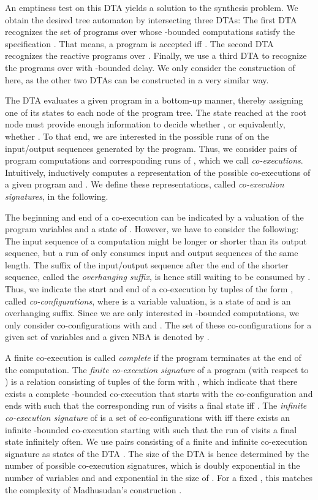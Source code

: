 \documentclass[submission,copyright,creativecommons]{eptcs}
\newcommand{\ignore}[1]{}
\begin{document}
An emptiness test on this DTA yields a solution to the synthesis problem.
We obtain the desired tree automaton by intersecting three DTAs:
The first DTA  recognizes
the set of programs over  whose -bounded computations satisfy the
specification . That means, a program  is accepted iff
.
The second DTA  recognizes the reactive
programs over .
Finally, we use a third DTA  to recognize the programs
over  with -bounded delay.
We only consider the construction of  here,
as the other two DTAs can be constructed in a very similar way.

The DTA  evaluates a given program  in a
bottom-up manner, thereby assigning one of its states to each node of the
program tree.
The state reached at the root node must provide
enough information to decide whether ,
or equivalently, whether
.
To that end, we are interested in the possible runs of 
on the input/output sequences generated by the program.
Thus, we consider pairs of program computations and corresponding runs of
, which we call \emph{co-executions}.
Intuitively,  inductively computes a
representation of the possible co-executions of a given program and
.
We define these representations, called \emph{co-execution signatures},
in the following.

The beginning and end of a co-execution can be indicated by
a valuation of the program variables and a state of .
However, we have to consider the following:
The input sequence of a computation might be longer or shorter than
its output sequence, but a run of  only consumes input and
output sequences of the same length.
The suffix of the input/output sequence after the end of the shorter sequence,
called the \emph{overhanging suffix}, is hence still waiting to be
consumed by .
Thus, we indicate the start and end of a co-execution by tuples of the
form , called \emph{co-configurations},
where  is a variable valuation,  is a state of  and
 is an
overhanging suffix.
Since we are only interested in -bounded computations, we only
consider co-configurations with  and .
The set of these co-configurations for a given set of variables  and a
given NBA  is denoted by .

A finite co-execution is called \emph{complete} if the program terminates at
the end of the computation.
The \emph{finite co-execution signature} 
of a program  (with respect to ) is a relation consisting of
tuples of the form  with ,
which indicate that there exists a complete -bounded co-execution that\ignore{TODO: k-bounded co-execution? Definition?}
starts with the co-configuration  and ends with  such that the corresponding
run of  visits a final state iff .
The \emph{infinite co-execution signature}
 of  is a set of co-configurations with
 iff there exists an infinite
-bounded co-execution starting with  such that the run of 
visits a final state infinitely often.
We use pairs consisting of a finite and infinite co-execution signature as
states of the DTA .
The size of the DTA is hence determined by the number of possible
co-execution signatures, which is doubly exponential in the number of
variables and  and exponential in the size of .
For a fixed , this matches the complexity of Madhusudan's construction
\cite{madhusudan:LIPIcs:2011:3247}.
\end{document}
